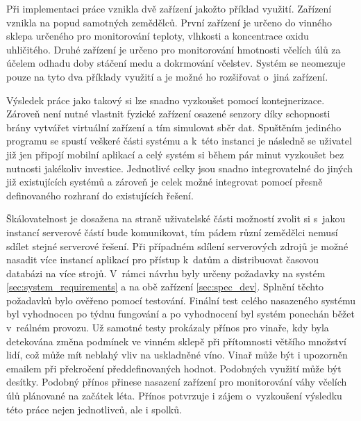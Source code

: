 Při implementaci práce vznikla dvě zařízení jakožto příklad využití. Zařízení vznikla na popud samotných zemědělců. První zařízení je určeno do vinného sklepa určeného pro monitorování teploty, vlhkosti a koncentrace oxidu uhličitého. Druhé zařízení je určeno pro monitorování hmotnosti včelích úlů za účelem odhadu doby stáčení medu a dokrmování včelstev. Systém se neomezuje pouze na tyto dva příklady využití a je možné ho rozšiřovat o~jiná zařízení. 

Výsledek práce jako takový si lze snadno vyzkoušet pomocí kontejnerizace. Zároveň není nutné vlastnit fyzické zařízení osazené senzory díky schopnosti brány vytvářet virtuální zařízení a tím simulovat sběr dat. Spuštěním jediného programu se spustí veškeré části systému a k~této instanci je následně se uživatel již jen připojí mobilní aplikací a celý systém si během pár minut vyzkoušet bez nutnosti jakékoliv investice. Jednotlivé celky jsou snadno integrovatelné do jiných již existujících systémů a zároveň je celek možné integrovat pomocí přesně definovaného rozhraní do existujících řešení. 

Škálovatelnost je dosažena na straně uživatelské části možností zvolit si s~jakou instancí serverové částí bude komunikovat, tím pádem různí zemědělci nemusí sdílet stejné serverové řešení. Při případném sdílení serverových zdrojů je možné nasadit více instancí aplikací pro přístup k~datům a distribuovat časovou databázi na více strojů. V~rámci návrhu byly určeny požadavky na systém \ref{sec:system_requirements} a na obě zařízení \ref{sec:spec_dev}. Splnění těchto požadavků bylo ověřeno pomocí testování. Finální test celého nasazeného systému byl vyhodnocen po týdnu fungování a po vyhodnocení byl systém ponechán běžet v~reálném provozu. Už samotné testy prokázaly přínos pro vinaře, kdy byla detekována změna podmínek ve vinném sklepě při přítomnosti většího množství lidí, což může mít neblahý vliv na uskladněné víno. Vinař může být i upozorněn emailem při překročení předdefinovaných hodnot. Podobných využití může být desítky. Podobný přínos přinese nasazení zařízení pro monitorování váhy včelích úlů plánované na začátek léta. Přínos potvrzuje i zájem o~vyzkoušení výsledku této práce nejen jednotlivců, ale i spolků.


